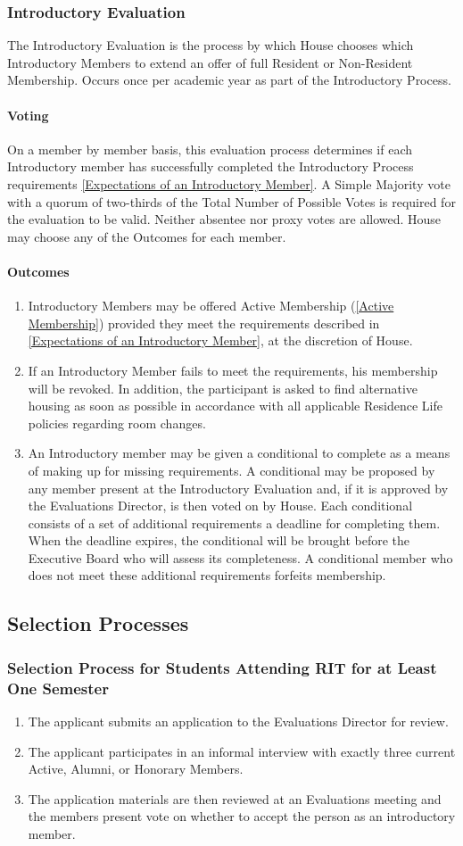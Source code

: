 \documentclass{article}
\newcommand{\bsection}[1]{\subsection{#1} \label{#1}}
\newcommand{\bsubsection}[1]{\subsubsection{#1} \label{#1}}
\newcommand{\bsubsubsection}[1]{\paragraph{#1} \label{#1}}
\begin{document}
\bsubsection{Introductory Evaluation}
The Introductory Evaluation is the process by which House chooses which Introductory Members to extend an offer of full Resident or Non-Resident Membership. Occurs once per academic year as part of the Introductory Process.
\bsubsubsection{Voting} 
On a member by member basis, this evaluation process determines if each Introductory member has successfully completed the Introductory Process requirements \ref{Expectations of an Introductory Member}. A Simple Majority vote with a quorum of two-thirds of the Total Number of Possible Votes is required for the evaluation to be valid. Neither absentee nor proxy votes are allowed. House may choose any of the Outcomes for each member.
\bsubsubsection{Outcomes} 
\renewcommand{\theenumi}{\alph{enumi}} %
\begin{enumerate}
	\item Introductory Members may be offered Active Membership (\ref{Active Membership}) provided they meet the requirements described in \ref{Expectations of an Introductory Member}, at the discretion of House.
	\item If an Introductory Member fails to meet the requirements, his membership will be revoked.
		In addition, the participant is asked to find alternative housing as soon as possible in accordance with all applicable Residence Life policies regarding room changes.
	\item An Introductory member may be given a conditional to complete as a means of making up for missing requirements.
		A conditional may be proposed by any member present at the Introductory Evaluation and, if it is approved by the Evaluations Director, is then voted on by House.
		Each conditional consists of a set of additional requirements a deadline for completing them.
		When the deadline expires, the conditional will be brought before the Executive Board who will assess its completeness. A conditional member who does not meet these additional requirements forfeits membership.
\end{enumerate}
\bsection{Selection Processes}
\renewcommand{\theenumi}{\alph{enumi}} %
\bsubsection{Selection Process for Students Attending RIT for at Least One Semester}
\begin{enumerate}
	\item The applicant submits an application to the Evaluations Director for review.
	\item The applicant participates in an informal interview with exactly three current Active, Alumni, or Honorary Members.
	\item The application materials are then reviewed at an Evaluations meeting and the members present vote on whether to accept the person as an introductory member.
\end{enumerate}
\end{document}

